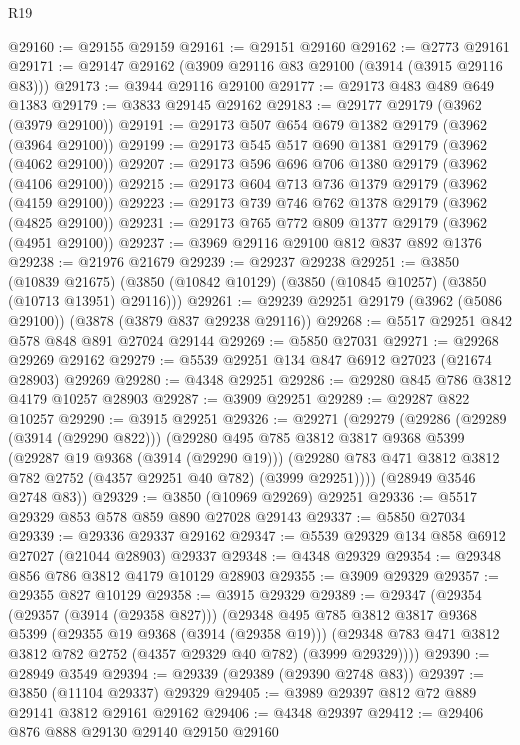 \begin{lexlean}{R19}
\begin{coremodule}
@29160 := @29155 @29159
@29161 := @29151 @29160
@29162 := @2773 @29161
@29171 := @29147 @29162 (@3909 @29116 @83 @29100 (@3914 (@3915 @29116 @83)))
@29173 := @3944 @29116 @29100
@29177 := @29173 @483 @489 @649 @1383
@29179 := @3833 @29145 @29162
@29183 := @29177 @29179 (@3962 (@3979 @29100))
@29191 := @29173 @507 @654 @679 @1382 @29179 (@3962 (@3964 @29100))
@29199 := @29173 @545 @517 @690 @1381 @29179 (@3962 (@4062 @29100))
@29207 := @29173 @596 @696 @706 @1380 @29179 (@3962 (@4106 @29100))
@29215 := @29173 @604 @713 @736 @1379 @29179 (@3962 (@4159 @29100))
@29223 := @29173 @739 @746 @762 @1378 @29179 (@3962 (@4825 @29100))
@29231 := @29173 @765 @772 @809 @1377 @29179 (@3962 (@4951 @29100))
@29237 := @3969 @29116 @29100 @812 @837 @892 @1376
@29238 := @21976 @21679
@29239 := @29237 @29238
@29251 := @3850
    (@10839 @21675)
    (@3850 (@10842 @10129) (@3850 (@10845 @10257) (@3850 (@10713 @13951) @29116)))
@29261 := @29239 @29251 @29179 (@3962 (@5086 @29100)) (@3878 (@3879 @837 @29238 @29116))
@29268 := @5517 @29251 @842 @578 @848 @891 @27024 @29144
@29269 := @5850 @27031
@29271 := @29268 @29269 @29162
@29279 := @5539 @29251 @134 @847 @6912 @27023 (@21674 @28903) @29269
@29280 := @4348 @29251
@29286 := @29280 @845 @786 @3812 @4179 @10257 @28903
@29287 := @3909 @29251
@29289 := @29287 @822 @10257
@29290 := @3915 @29251
@29326 := @29271
    (@29279
      (@29286
        (@29289 (@3914 (@29290 @822)))
        (@29280
          @495
          @785
          @3812
          @3817
          @9368
          @5399
          (@29287 @19 @9368 (@3914 (@29290 @19)))
          (@29280 @783 @471 @3812 @3812 @782 @2752 (@4357 @29251 @40 @782) (@3999 @29251))))
      (@28949 @3546 @2748 @83))
@29329 := @3850 (@10969 @29269) @29251
@29336 := @5517 @29329 @853 @578 @859 @890 @27028 @29143
@29337 := @5850 @27034
@29339 := @29336 @29337 @29162
@29347 := @5539 @29329 @134 @858 @6912 @27027 (@21044 @28903) @29337
@29348 := @4348 @29329
@29354 := @29348 @856 @786 @3812 @4179 @10129 @28903
@29355 := @3909 @29329
@29357 := @29355 @827 @10129
@29358 := @3915 @29329
@29389 := @29347
    (@29354
      (@29357 (@3914 (@29358 @827)))
      (@29348
        @495
        @785
        @3812
        @3817
        @9368
        @5399
        (@29355 @19 @9368 (@3914 (@29358 @19)))
        (@29348 @783 @471 @3812 @3812 @782 @2752 (@4357 @29329 @40 @782) (@3999 @29329))))
@29390 := @28949 @3549
@29394 := @29339 (@29389 (@29390 @2748 @83))
@29397 := @3850 (@11104 @29337) @29329
@29405 := @3989 @29397 @812 @72 @889 @29141 @3812 @29161 @29162
@29406 := @4348 @29397
@29412 := @29406 @876 @888 @29130 @29140 @29150 @29160

\end{coremodule}
\end{lexlean}
